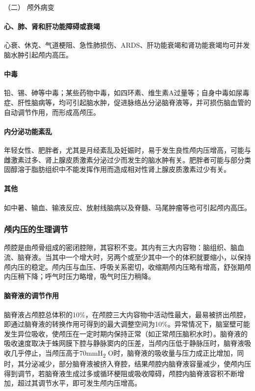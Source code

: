 \hypertarget{text00107.htmlux5cux23CHP4-6-1-1-2}{}
（二） 颅外病变

\paragraph{心、肺、肾和肝功能障碍或衰竭}

心衰、休克、气道梗阻、急性肺损伤、ARDS、肝功能衰竭和肾功能衰竭均可并发脑水肿引起颅内高压。

\paragraph{中毒}

铅、锡、砷等中毒；某些药物中毒，如四环素、维生素A过量等；自身中毒如尿毒症、肝性脑病等，均可引起脑水肿，促进脉络丛分泌脑脊液等，并可损伤脑血管的自动调节作用，而形成高颅压。

\paragraph{内分泌功能紊乱}

年轻女性、肥胖者，尤其是月经紊乱及妊娠时，易于发生良性颅内压增高，可能与雌激素过多、肾上腺皮质激素分泌过少而发生的脑水肿有关。肥胖者可能与部分类固醇溶于脂肪组织中不能发挥作用而造成相对性肾上腺皮质激素过少有关。

\paragraph{其他}

如中暑、输血、输液反应、放射线脑病以及脊髓、马尾肿瘤等也可引起颅内高压。

\subsubsection{颅内压的生理调节}

颅腔是由颅骨组成的密闭腔隙，其容积不变。其内有三大内容物：脑组织、脑血流、脑脊液。当其中一个增大时，另两个或至少其中一个的体积就要缩小，以保持颅内压的稳定。颅内压与血压、呼吸关系密切，收缩期颅内压略有增高，舒张期颅内压稍下降；呼气时压力略增，吸气时压力稍降。

\paragraph{脑脊液的调节作用}

脑脊液占颅腔总体积的10\%，在颅腔三大内容物中活动性最大，最易被挤出颅腔，即通过脑脊液的转换作用可得到的最大调整空间为10\%。异常情况下，脑室壁可能发生异位吸收，使颅压在一定时期内保持正常（如正常颅压脑积水时）。脑脊液的吸收速度取决于蛛网膜下腔与静脉窦内的压差，当颅内压低于静脉压时，脑脊液吸收几乎停止，当颅压高于70mmH\textsubscript{2}
O时，脑脊液的吸收量与压力成正比增加，同时，其分泌减少，部分脑脊液被挤入脊腔，结果颅腔内脑脊液容量减少，使颅内压得到调节，若脑脊液生成过多或循环梗阻或吸收障碍，颅腔内脑脊液容积不断增加，超过其调节水平，即可发生颅内压增高。

